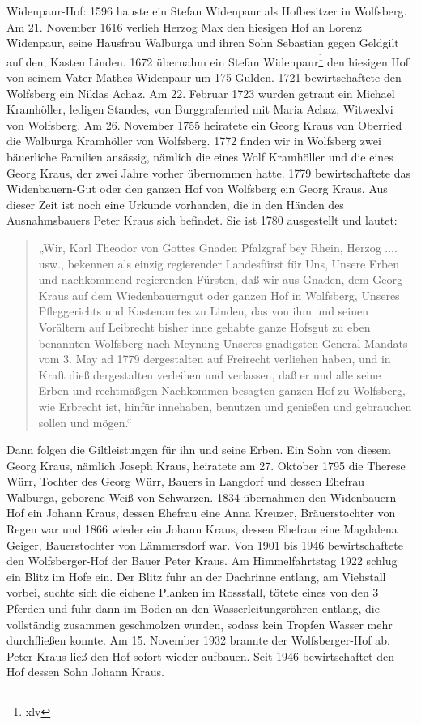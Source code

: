 \documentclass{book}
\begin{document}
Widenpaur-Hof: 1596 hauste ein Stefan Widenpaur als Hofbesitzer in
Wolfsberg. Am 21. November 1616 verlieh Herzog Max den hiesigen Hof an
Lorenz Widenpaur, seine Hausfrau Walburga und ihren Sohn Sebastian gegen
Geldgilt auf den, Kasten Linden. 1672 übernahm ein Stefan
Widenpaur\footnote{xlv} den hiesigen Hof von seinem Vater Mathes
Widenpaur um 175 Gulden. 1721 bewirtschaftete den Wolfsberg ein Niklas
Achaz. Am 22. Februar 1723 wurden getraut ein Michael Kramhöller,
ledigen Standes, von Burggrafenried mit Maria Achaz, Witwexlvi von
Wolfsberg. Am 26. November 1755 heiratete ein Georg Kraus von Oberried
die Walburga Kramhöller von Wolfsberg. 1772 finden wir in Wolfsberg zwei
bäuerliche Familien ansässig, nämlich die eines Wolf Kramhöller und die
eines Georg Kraus, der zwei Jahre vorher übernommen hatte. 1779
bewirtschaftete das Widenbauern-Gut oder den ganzen Hof von Wolfsberg
ein Georg Kraus. Aus dieser Zeit ist noch eine Urkunde vorhanden, die in
den Händen des Ausnahmsbauers Peter Kraus sich befindet. Sie ist 1780
ausgestellt und lautet:

\begin{quote}
„Wir, Karl Theodor von Gottes Gnaden Pfalzgraf bey Rhein, Herzog ....
usw., bekennen als einzig regierender Landesfürst für Uns, Unsere Erben
und nachkommend regierenden Fürsten, daß wir aus Gnaden, dem Georg Kraus
auf dem Wiedenbauerngut oder ganzen Hof in Wolfsberg, Unseres
Pfleggerichts und Kastenamtes zu Linden, das von ihm und seinen
Vorältern auf Leibrecht bisher inne gehabte ganze Hofsgut zu eben
benannten Wolfsberg nach Meynung Unseres gnädigsten General-Mandats vom
3. May ad 1779 dergestalten auf Freirecht verliehen haben, und in Kraft
dieß dergestalten verleihen und verlassen, daß er und alle seine Erben
und rechtmäßgen Nachkommen besagten ganzen Hof zu Wolfsberg, wie
Erbrecht ist, hinfür innehaben, benutzen und genießen und gebrauchen
sollen und mögen.“
\end{quote}

Dann folgen die Giltleistungen für ihn und seine Erben. Ein Sohn von
diesem Georg Kraus, nämlich Joseph Kraus, heiratete am 27. Oktober 1795
die Therese Würr, Tochter des Georg Würr, Bauers in Langdorf und dessen
Ehefrau Walburga, geborene Weiß von Schwarzen. 1834 übernahmen den
Widenbauern-Hof ein Johann Kraus, dessen Ehefrau eine Anna Kreuzer,
Bräuerstochter von Regen war und 1866 wieder ein Johann Kraus, dessen
Ehefrau eine Magdalena Geiger, Bauerstochter von Lämmersdorf war. Von
1901 bis 1946 bewirtschaftete den Wolfsberger-Hof der Bauer Peter Kraus.
Am Himmelfahrtstag 1922 schlug ein Blitz im Hofe ein. Der Blitz fuhr an
der Dachrinne entlang, am Viehstall vorbei, suchte sich die eichene
Planken im Rossstall, tötete eines von den 3 Pferden und fuhr dann im
Boden an den Wasserleitungsröhren entlang, die vollständig zusammen
geschmolzen wurden, sodass kein Tropfen Wasser mehr durchfließen konnte.
Am 15. November 1932 brannte der Wolfsberger-Hof ab. Peter Kraus ließ
den Hof sofort wieder aufbauen. Seit 1946 bewirtschaftet den Hof dessen
Sohn Johann Kraus.
\end{document}
